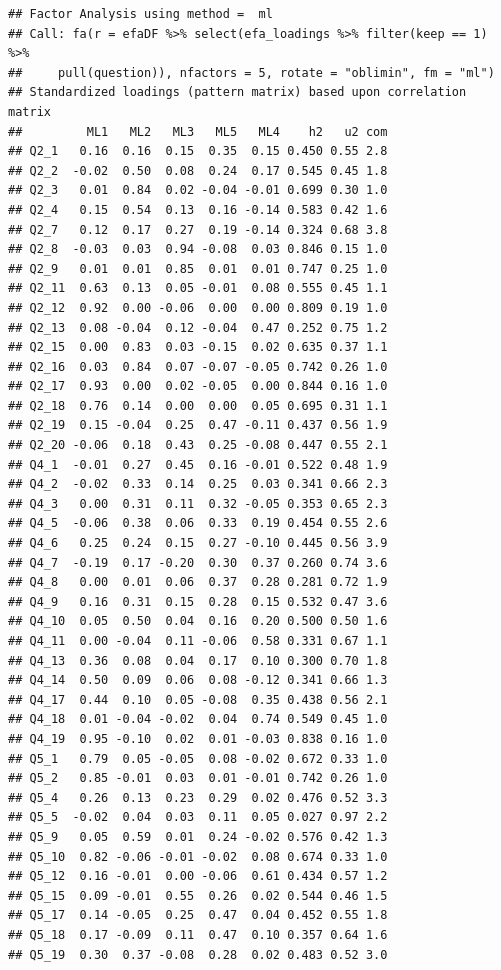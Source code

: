 \documentclass[
  man]{apa6}
\begin{document}
\begin{verbatim}
## Factor Analysis using method =  ml
## Call: fa(r = efaDF %>% select(efa_loadings %>% filter(keep == 1) %>% 
##     pull(question)), nfactors = 5, rotate = "oblimin", fm = "ml")
## Standardized loadings (pattern matrix) based upon correlation matrix
##         ML1   ML2   ML3   ML5   ML4    h2   u2 com
## Q2_1   0.16  0.16  0.15  0.35  0.15 0.450 0.55 2.8
## Q2_2  -0.02  0.50  0.08  0.24  0.17 0.545 0.45 1.8
## Q2_3   0.01  0.84  0.02 -0.04 -0.01 0.699 0.30 1.0
## Q2_4   0.15  0.54  0.13  0.16 -0.14 0.583 0.42 1.6
## Q2_7   0.12  0.17  0.27  0.19 -0.14 0.324 0.68 3.8
## Q2_8  -0.03  0.03  0.94 -0.08  0.03 0.846 0.15 1.0
## Q2_9   0.01  0.01  0.85  0.01  0.01 0.747 0.25 1.0
## Q2_11  0.63  0.13  0.05 -0.01  0.08 0.555 0.45 1.1
## Q2_12  0.92  0.00 -0.06  0.00  0.00 0.809 0.19 1.0
## Q2_13  0.08 -0.04  0.12 -0.04  0.47 0.252 0.75 1.2
## Q2_15  0.00  0.83  0.03 -0.15  0.02 0.635 0.37 1.1
## Q2_16  0.03  0.84  0.07 -0.07 -0.05 0.742 0.26 1.0
## Q2_17  0.93  0.00  0.02 -0.05  0.00 0.844 0.16 1.0
## Q2_18  0.76  0.14  0.00  0.00  0.05 0.695 0.31 1.1
## Q2_19  0.15 -0.04  0.25  0.47 -0.11 0.437 0.56 1.9
## Q2_20 -0.06  0.18  0.43  0.25 -0.08 0.447 0.55 2.1
## Q4_1  -0.01  0.27  0.45  0.16 -0.01 0.522 0.48 1.9
## Q4_2  -0.02  0.33  0.14  0.25  0.03 0.341 0.66 2.3
## Q4_3   0.00  0.31  0.11  0.32 -0.05 0.353 0.65 2.3
## Q4_5  -0.06  0.38  0.06  0.33  0.19 0.454 0.55 2.6
## Q4_6   0.25  0.24  0.15  0.27 -0.10 0.445 0.56 3.9
## Q4_7  -0.19  0.17 -0.20  0.30  0.37 0.260 0.74 3.6
## Q4_8   0.00  0.01  0.06  0.37  0.28 0.281 0.72 1.9
## Q4_9   0.16  0.31  0.15  0.28  0.15 0.532 0.47 3.6
## Q4_10  0.05  0.50  0.04  0.16  0.20 0.500 0.50 1.6
## Q4_11  0.00 -0.04  0.11 -0.06  0.58 0.331 0.67 1.1
## Q4_13  0.36  0.08  0.04  0.17  0.10 0.300 0.70 1.8
## Q4_14  0.50  0.09  0.06  0.08 -0.12 0.341 0.66 1.3
## Q4_17  0.44  0.10  0.05 -0.08  0.35 0.438 0.56 2.1
## Q4_18  0.01 -0.04 -0.02  0.04  0.74 0.549 0.45 1.0
## Q4_19  0.95 -0.10  0.02  0.01 -0.03 0.838 0.16 1.0
## Q5_1   0.79  0.05 -0.05  0.08 -0.02 0.672 0.33 1.0
## Q5_2   0.85 -0.01  0.03  0.01 -0.01 0.742 0.26 1.0
## Q5_4   0.26  0.13  0.23  0.29  0.02 0.476 0.52 3.3
## Q5_5  -0.02  0.04  0.03  0.11  0.05 0.027 0.97 2.2
## Q5_9   0.05  0.59  0.01  0.24 -0.02 0.576 0.42 1.3
## Q5_10  0.82 -0.06 -0.01 -0.02  0.08 0.674 0.33 1.0
## Q5_12  0.16 -0.01  0.00 -0.06  0.61 0.434 0.57 1.2
## Q5_15  0.09 -0.01  0.55  0.26  0.02 0.544 0.46 1.5
## Q5_17  0.14 -0.05  0.25  0.47  0.04 0.452 0.55 1.8
## Q5_18  0.17 -0.09  0.11  0.47  0.10 0.357 0.64 1.6
## Q5_19  0.30  0.37 -0.08  0.28  0.02 0.483 0.52 3.0

\end{verbatim}
\end{document}
